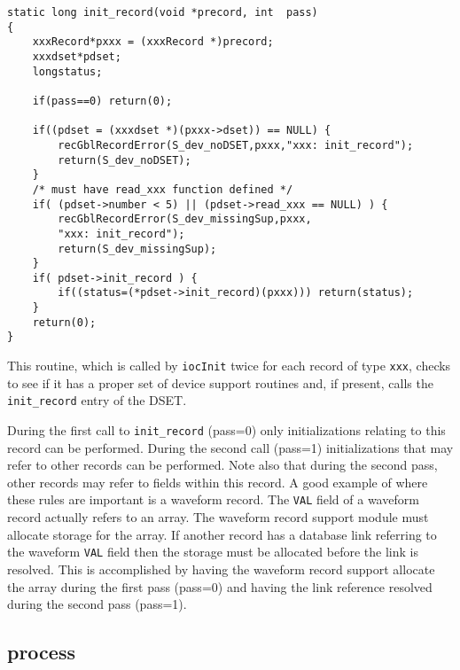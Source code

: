 \begin{verbatim}
static long init_record(void *precord, int  pass)
{
    xxxRecord*pxxx = (xxxRecord *)precord;
    xxxdset*pdset;
    longstatus;

    if(pass==0) return(0); 

    if((pdset = (xxxdset *)(pxxx->dset)) == NULL) {
        recGblRecordError(S_dev_noDSET,pxxx,"xxx: init_record");
        return(S_dev_noDSET);
    }
    /* must have read_xxx function defined */
    if( (pdset->number < 5) || (pdset->read_xxx == NULL) ) {
        recGblRecordError(S_dev_missingSup,pxxx,
        "xxx: init_record");
        return(S_dev_missingSup);
    }
    if( pdset->init_record ) {
        if((status=(*pdset->init_record)(pxxx))) return(status);
    }
    return(0);
}
\end{verbatim}This routine, which is called by \verb|iocInit| twice for each record of type \verb|xxx|, checks to see if it has a proper set of device 
support routines and, if present, calls the \verb|init_record| entry of the DSET.

During the first call to \verb|init_record| (pass=0) only initializations relating to this record can be performed. During the 
second call (pass=1) initializations that may refer to other records can be performed. Note also that during the second 
pass, other records may refer to fields within this record. A good example of where these rules are important is a 
waveform record. The \verb|VAL| field of a waveform record actually refers to an array. The waveform record support module 
must allocate storage for the array. If another record has a database link referring to the waveform \verb|VAL| field then the 
storage must be allocated before the link is resolved. This is accomplished by having the waveform record support 
allocate the array during the first pass (pass=0) and having the link reference resolved during the second pass (pass=1).

\subsection{process}


